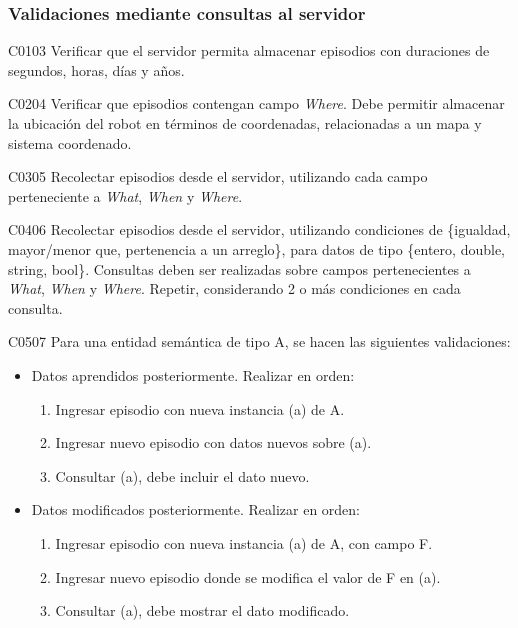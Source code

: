 \subsubsection{Validaciones mediante consultas al servidor}

\begin{def-validacion}{C}{01}{03}
	Verificar que el servidor permita almacenar episodios con duraciones de segundos, horas, días y años.	
\end{def-validacion}

\begin{def-validacion}{C}{02}{04}
	Verificar que episodios contengan campo \textit{Where}. Debe permitir almacenar la ubicación del robot en términos de coordenadas, relacionadas a un mapa y sistema coordenado.
\end{def-validacion}

\begin{def-validacion}{C}{03}{05}
	Recolectar episodios desde el servidor, utilizando cada campo perteneciente a \textit{What}, \textit{When} y \textit{Where}.
\end{def-validacion}

\begin{def-validacion}{C}{04}{06}
	Recolectar episodios desde el servidor, utilizando condiciones de \{igualdad, mayor/menor que, pertenencia a un arreglo\}, para datos de tipo \{entero, double, string, bool\}. Consultas deben ser realizadas sobre campos pertenecientes a \textit{What}, \textit{When} y \textit{Where}. Repetir, considerando 2 o más condiciones en cada consulta.
\end{def-validacion}

\begin{def-validacion}{C}{05}{07}
	Para una entidad semántica de tipo A, se hacen las siguientes validaciones:
	\begin{itemize}
		\item Datos aprendidos posteriormente. Realizar en orden:
		\begin{enumerate}
			\item Ingresar episodio con nueva instancia (a) de A.
			\item Ingresar nuevo episodio con datos nuevos sobre (a).
			\item Consultar (a), debe incluir el dato nuevo.
		\end{enumerate}
		\item Datos modificados posteriormente. Realizar en orden:
		\begin{enumerate}
			\item Ingresar episodio con nueva instancia (a) de A, con campo F.
			\item Ingresar nuevo episodio donde se modifica el valor de F en (a).
			\item Consultar (a), debe mostrar el dato modificado.
		\end{enumerate}
	\end{itemize}
\end{def-validacion}


